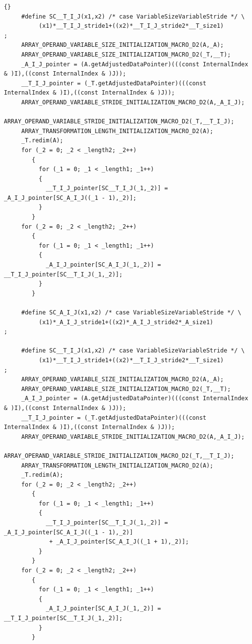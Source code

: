 \documentclass[10pt]{article}
\begin{document}
{\begin{lstlisting}{}
     #define SC__T_I_J(x1,x2) /* case VariableSizeVariableStride */ \
          (x1)*__T_I_J_stride1+((x2)*__T_I_J_stride2*__T_size1)
; 
     ARRAY_OPERAND_VARIABLE_SIZE_INITIALIZATION_MACRO_D2(A,_A); 
     ARRAY_OPERAND_VARIABLE_SIZE_INITIALIZATION_MACRO_D2(_T,__T); 
     _A_I_J_pointer = (A.getAdjustedDataPointer)(((const InternalIndex & )I),((const InternalIndex & )J)); 
     __T_I_J_pointer = (_T.getAdjustedDataPointer)(((const InternalIndex & )I),((const InternalIndex & )J)); 
     ARRAY_OPERAND_VARIABLE_STRIDE_INITIALIZATION_MACRO_D2(A,_A_I_J); 
     ARRAY_OPERAND_VARIABLE_STRIDE_INITIALIZATION_MACRO_D2(_T,__T_I_J); 
     ARRAY_TRANSFORMATION_LENGTH_INITIALIZATION_MACRO_D2(A); 
     _T.redim(A); 
     for (_2 = 0; _2 < _length2; _2++)
        { 
          for (_1 = 0; _1 < _length1; _1++)
          { 
            __T_I_J_pointer[SC__T_I_J(_1,_2)] = _A_I_J_pointer[SC_A_I_J((_1 - 1),_2)]; 
          } 
        } 
     for (_2 = 0; _2 < _length2; _2++)
        { 
          for (_1 = 0; _1 < _length1; _1++)
          { 
            _A_I_J_pointer[SC_A_I_J(_1,_2)] = __T_I_J_pointer[SC__T_I_J(_1,_2)]; 
          } 
        } 
        
     #define SC_A_I_J(x1,x2) /* case VariableSizeVariableStride */ \
          (x1)*_A_I_J_stride1+((x2)*_A_I_J_stride2*_A_size1)
; 
        
     #define SC__T_I_J(x1,x2) /* case VariableSizeVariableStride */ \
          (x1)*__T_I_J_stride1+((x2)*__T_I_J_stride2*__T_size1)
; 
     ARRAY_OPERAND_VARIABLE_SIZE_INITIALIZATION_MACRO_D2(A,_A); 
     ARRAY_OPERAND_VARIABLE_SIZE_INITIALIZATION_MACRO_D2(_T,__T); 
     _A_I_J_pointer = (A.getAdjustedDataPointer)(((const InternalIndex & )I),((const InternalIndex & )J)); 
     __T_I_J_pointer = (_T.getAdjustedDataPointer)(((const InternalIndex & )I),((const InternalIndex & )J)); 
     ARRAY_OPERAND_VARIABLE_STRIDE_INITIALIZATION_MACRO_D2(A,_A_I_J); 
     ARRAY_OPERAND_VARIABLE_STRIDE_INITIALIZATION_MACRO_D2(_T,__T_I_J); 
     ARRAY_TRANSFORMATION_LENGTH_INITIALIZATION_MACRO_D2(A); 
     _T.redim(A); 
     for (_2 = 0; _2 < _length2; _2++)
        { 
          for (_1 = 0; _1 < _length1; _1++)
          { 
            __T_I_J_pointer[SC__T_I_J(_1,_2)] = _A_I_J_pointer[SC_A_I_J((_1 - 1),_2)]
             + _A_I_J_pointer[SC_A_I_J((_1 + 1),_2)]; 
          } 
        } 
     for (_2 = 0; _2 < _length2; _2++)
        { 
          for (_1 = 0; _1 < _length1; _1++)
          { 
            _A_I_J_pointer[SC_A_I_J(_1,_2)] = __T_I_J_pointer[SC__T_I_J(_1,_2)]; 
          } 
        } 
        

\end{lstlisting}}
\end{document}
